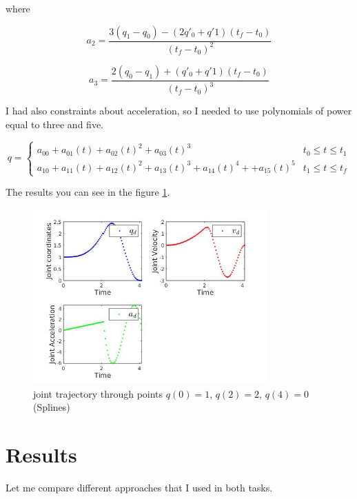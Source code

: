 \documentclass[12pt, a4paper]{report}
\begin{document}
where 

\begin{equation}
	a_2 = \frac{3(q_1-q_0)-(2q'_0+q'1)(t_f-t_0)}{(t_f-t_0)^2}
\end{equation}


\begin{equation}
	a_3 = \frac{2(q_0-q_1)+(q'_0+q'1)(t_f-t_0)}{(t_f-t_0)^3}
\end{equation}

I had also constraints about acceleration, so I needed to use polynomials of power equal to three and five.

\begin{equation}
	q = \begin{cases}
	a_{00} + a_{01}(t) + a_{02}(t)^2 +a_{03}(t)^3 & t_0 \leq t \leq t_1 \\
	a_{10} + a_{11}(t) + a_{12}(t)^2 +a_{13}(t)^3+a_{14}(t)^4++a_{15}(t)^5  & t_1 \leqslant t \leq t_f
	\end{cases}
\end{equation}

The results you can see in the figure \ref{fig:mesh7}.

\begin{figure}[H]
	\centering
		\includegraphics[width=0.8\textwidth]{23} %
	\caption{joint trajectory through points $q(0) = 1$, $q(2) = 2$, $q(4) = 0$ (Splines)} %
	\label{fig:mesh7}
\end{figure}

\section*{Results} \label{sec:Results}
%

Let me compare different approaches that I used in both tasks.
\end{document}
